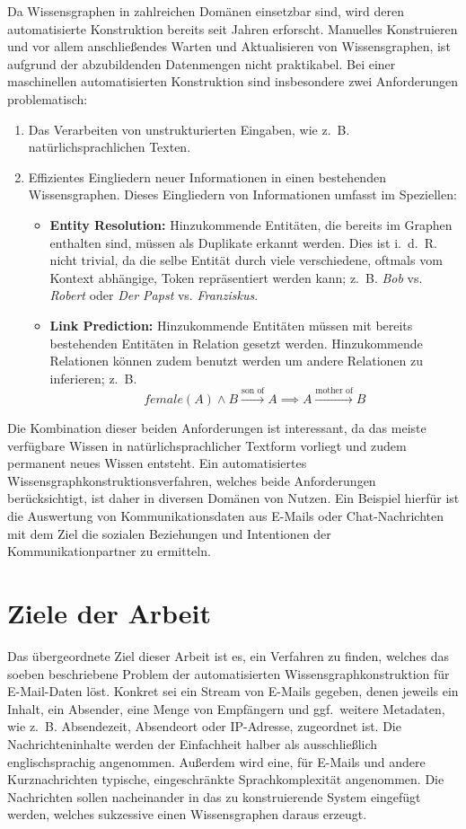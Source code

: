 Da Wissensgraphen in zahlreichen Domänen einsetzbar sind, wird deren automatisierte Konstruktion bereits seit Jahren erforscht.
Manuelles Konstruieren und vor allem anschließendes Warten und Aktualisieren von Wissensgraphen, ist aufgrund der abzubildenden Datenmengen nicht praktikabel.
Bei einer maschinellen automatisierten Konstruktion sind insbesondere zwei Anforderungen problematisch:
\begin{enumerate}
	\item Das Verarbeiten von unstrukturierten Eingaben, wie z.~B. natürlichsprachlichen Texten.
	\item Effizientes Eingliedern neuer Informationen in einen bestehenden Wissensgraphen.
		Dieses Eingliedern von Informationen umfasst im Speziellen:
		\begin{itemize}
			\item \textbf{Entity Resolution:}
				Hinzukommende Entitäten, die bereits im Graphen enthalten sind, müssen als Duplikate erkannt werden.
				Dies ist i.~d.~R. nicht trivial, da die selbe Entität durch viele verschiedene, oftmals vom Kontext abhängige, Token repräsentiert werden kann;
				z.~B. \textit{Bob} vs. \textit{Robert} oder \textit{Der Papst} vs. \textit{Franziskus}.
			\item \textbf{Link Prediction:}
				Hinzukommende Entitäten müssen mit bereits bestehenden Entitäten in Relation gesetzt werden.
				Hinzukommende Relationen können zudem benutzt werden um andere Relationen zu inferieren;
				z.~B. \[female(A) \land B \xrightarrow{\text{son~of}} A \implies A \xrightarrow{\text{mother~of}} B\]
		\end{itemize}
\end{enumerate}

Die Kombination dieser beiden Anforderungen ist interessant, da das meiste verfügbare Wissen in natürlichsprachlicher Textform vorliegt und zudem permanent neues Wissen entsteht.
Ein automatisiertes Wissensgraphkonstruktionsverfahren, welches beide Anforderungen berücksichtigt, ist daher in diversen Domänen von Nutzen.
Ein Beispiel hierfür ist die Auswertung von Kommunikationsdaten aus E-Mails oder Chat-Nachrichten mit dem Ziel die sozialen Beziehungen und Intentionen der Kommunikationpartner zu ermitteln.

\section{Ziele der Arbeit}
\label{sec:intro:goals}

Das übergeordnete Ziel dieser Arbeit ist es, ein Verfahren zu finden, welches das soeben beschriebene Problem der automatisierten Wissensgraphkonstruktion für E-Mail-Daten löst.
Konkret sei ein Stream von E-Mails gegeben, denen jeweils ein Inhalt, ein Absender, eine Menge von Empfängern und ggf.\ weitere Metadaten, wie z.~B. Absendezeit, Absendeort oder IP-Adresse, zugeordnet ist.
Die Nachrichteninhalte werden der Einfachheit halber als ausschließlich englischsprachig angenommen.
Außerdem wird eine, für E-Mails und andere Kurznachrichten typische, eingeschränkte Sprachkomplexität angenommen.
Die Nachrichten sollen nacheinander in das zu konstruierende System eingefügt werden, welches sukzessive einen Wissensgraphen daraus erzeugt.


